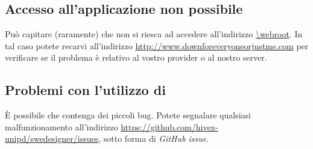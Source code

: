 \subsection{Accesso all'applicazione non possibile}

Può capitare (raramente) che non si riesca ad accedere all'indirizzo \url{\webroot}. In tal caso potete recarvi all'indirizzo \url{http://www.downforeveryoneorjustme.com} per verificare se il problema è relativo al vostro provider o al nostro server.


\subsection{Problemi con l'utilizzo di \proj}

È possibile che \proj{} contenga dei piccoli bug. Potete segnalare qualsiasi malfunzionamento all'indirizzo \url{https://github.com/hivex-unipd/swedesigner/issues}, sotto forma di \emph{GitHub issue}.



